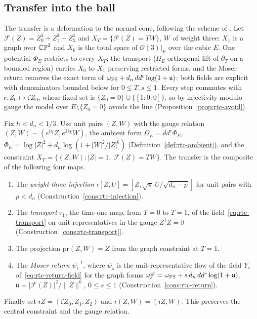 \subsection{Transfer into the ball}

The transfer is a deformation to the normal cone, following the scheme of \cite{OpenAI2026}. Let $\mathcal F(Z)=Z_0^3+Z_1^3+Z_2^3$ and $X_T=\{\mathcal F(Z)=TW\}$, $W$ of weight three: $X_1$ is a graph over $\mathbb{CP}^2$ and $X_0$ is the total space of $\mathcal O(3)|_E$ over the cubic $E$. One potential $\Phi_E$ restricts to every $X_T$; the transport ($\Omega_E$-orthogonal lift of $\partial_T$ on a bounded region) carries $X_0$ to $X_1$ preserving restricted forms, and the Moser return removes the exact term of $\omega_{\rm FS}+d_n\,dd^c\log(1+\mathfrak u)$; both fields are explicit with denominators bounded below for $0\le T,s\le1$. Every step commutes with $\mathsf r\colon Z_0\mapsto\zeta Z_0$, whose fixed set is $\{Z_0=0\}\cup\{[1:0:0]\}$, so by injectivity modulo gauge the model over $E\setminus\{Z_0=0\}$ avoids the line (Proposition~\ref{prop:rtc-avoid}).

\begin{construction}\label{cons:cub-transfer}
Fix $h<d_n<1/3$. Use unit pairs $(Z,W)$ with the gauge relation $(Z,W)\sim(e^{i\chi}Z,e^{3i\chi}W)$, the ambient form
$\Omega_E=dd^c\Phi_E$, $\Phi_E=\log|Z|^2+d_n\log(1+|W|^2/|Z|^6)$ (Definition~\ref{def:rtc-ambient}), and the constraint
$X_T=\{(Z,W):|Z|=1,\ \mathcal F(Z)=TW\}$. The transfer is the composite of the following four maps.
\begin{enumerate}[label=(\arabic*)]
\item The \emph{weight-three injection} $\iota[Z,U]=[Z,\sqrt\pi\,U/\sqrt{d_n-p}]$ for unit pairs with $p<d_n$
 (Construction~\ref{cons:rtc-injection}).
\item The \emph{transport} $\tau_1$, the time-one map, from $T=0$ to $T=1$, of the field~\eqref{eq:rtc-transport} on
 unit representatives in the gauge $Z^\dagger\dot Z=0$ (Construction~\ref{cons:rtc-transport}).
\item The projection $\mathrm{pr}(Z,W)=Z$ from the graph constraint at $T=1$.
\item The \emph{Moser return} $\psi_1^{-1}$, where $\psi_s$ is the unit-representative flow of the field
 $Y_s$ of~\eqref{eq:rtc-return-field} for the graph forms $\omega^{\rm gr}_s=\omega_{\rm FS}+s\,d_n\,dd^c\log(1+\mathfrak u)$,
 $\mathfrak u=|\mathcal F(Z)|^2/\|Z\|^6$, $0\le s\le1$ (Construction~\ref{cons:rtc-return}).
\end{enumerate}
Finally set $\mathsf r Z=(\zeta Z_0,Z_1,Z_2)$ and $\mathsf r(Z,W)=(\mathsf r Z,W)$. This preserves the central constraint and the gauge relation.
\end{construction}

